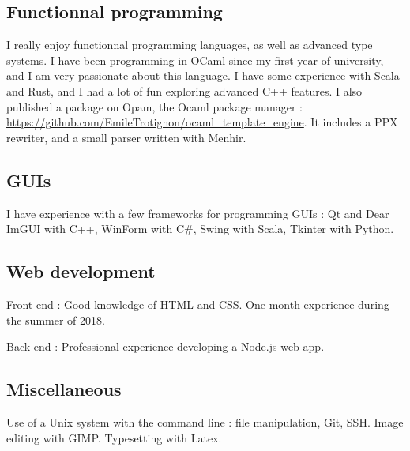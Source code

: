 \documentclass[10pt, a4paper, roman, french]{moderncv}
\begin{document}
		\subsection{Functionnal programming}
			 I really enjoy functionnal programming languages, as well as advanced type systems. I have been programming in OCaml since my first year of university, and I am very passionate about this language. I have some experience with Scala and Rust, and I had a lot of fun exploring advanced C++ features.
I also published a package on Opam, the Ocaml package manager : \url{https://github.com/EmileTrotignon/ocaml_template_engine}.
It includes a PPX rewriter, and a small parser written with Menhir.
	
		\subsection{GUIs}
			I have experience with a few frameworks for programming GUIs :
Qt and Dear ImGUI with C++, WinForm with C\#, Swing with Scala, Tkinter with Python.
	
		\subsection{Web development}
			Front-end : Good knowledge of HTML and CSS. One month experience during the summer of 2018.

Back-end : Professional experience developing a Node.js web app.
	
		\subsection{Miscellaneous}
			Use of a Unix system with the command line : file manipulation, Git, SSH.
Image editing with GIMP.
Typesetting with Latex.
	
\end{document}
